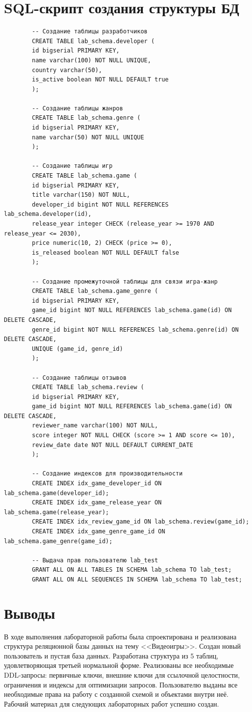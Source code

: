 \documentclass[oneside,a4paper,14pt]{extarticle}
\begin{document}
	\section*{SQL-скрипт создания структуры БД}
	
	\begin{lstlisting}
		-- Создание таблицы разработчиков
		CREATE TABLE lab_schema.developer (
		id bigserial PRIMARY KEY,
		name varchar(100) NOT NULL UNIQUE,
		country varchar(50),
		is_active boolean NOT NULL DEFAULT true
		);
		
		-- Создание таблицы жанров
		CREATE TABLE lab_schema.genre (
		id bigserial PRIMARY KEY,
		name varchar(50) NOT NULL UNIQUE
		);
		
		-- Создание таблицы игр
		CREATE TABLE lab_schema.game (
		id bigserial PRIMARY KEY,
		title varchar(150) NOT NULL,
		developer_id bigint NOT NULL REFERENCES lab_schema.developer(id),
		release_year integer CHECK (release_year >= 1970 AND release_year <= 2030),
		price numeric(10, 2) CHECK (price >= 0),
		is_released boolean NOT NULL DEFAULT false
		);
		
		-- Создание промежуточной таблицы для связи игра-жанр
		CREATE TABLE lab_schema.game_genre (
		id bigserial PRIMARY KEY,
		game_id bigint NOT NULL REFERENCES lab_schema.game(id) ON DELETE CASCADE,
		genre_id bigint NOT NULL REFERENCES lab_schema.genre(id) ON DELETE CASCADE,
		UNIQUE (game_id, genre_id)
		);
		
		-- Создание таблицы отзывов
		CREATE TABLE lab_schema.review (
		id bigserial PRIMARY KEY,
		game_id bigint NOT NULL REFERENCES lab_schema.game(id) ON DELETE CASCADE,
		reviewer_name varchar(100) NOT NULL,
		score integer NOT NULL CHECK (score >= 1 AND score <= 10),
		review_date date NOT NULL DEFAULT CURRENT_DATE
		);
		
		-- Создание индексов для производительности
		CREATE INDEX idx_game_developer_id ON lab_schema.game(developer_id);
		CREATE INDEX idx_game_release_year ON lab_schema.game(release_year);
		CREATE INDEX idx_review_game_id ON lab_schema.review(game_id);
		CREATE INDEX idx_game_genre_game_id ON lab_schema.game_genre(game_id);
		
		-- Выдача прав пользователю lab_test
		GRANT ALL ON ALL TABLES IN SCHEMA lab_schema TO lab_test;
		GRANT ALL ON ALL SEQUENCES IN SCHEMA lab_schema TO lab_test;
	\end{lstlisting}
	
	\newpage
	\section*{Выводы} В ходе выполнения лабораторной работы была спроектирована и реализована структура реляционной базы данных на тему <<Видеоигры>>. Создан новый пользователь и пустая база данных. Разработана структура из 5 таблиц, удовлетворяющая третьей нормальной форме. Реализованы все необходимые DDL-запросы: первичные ключи, внешние ключи для ссылочной целостности, ограничения и индексы для оптимизации запросов. Пользователю выданы все необходимые права на работу с созданной схемой и объектами внутри неё. Рабочий материал для следующих лабораторных работ успешно создан.
	
\end{document}
